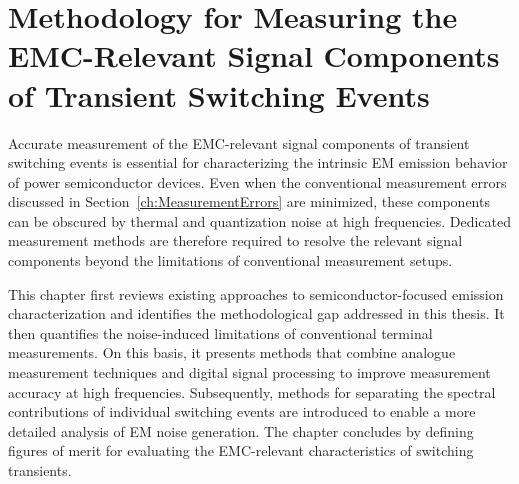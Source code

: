 
\chapter{Methodology for Measuring the EMC-Relevant Signal Components of Transient Switching Events}
\label{ch:Methods}

Accurate measurement of the EMC-relevant signal components of transient switching events is essential for characterizing the intrinsic EM emission behavior of power semiconductor devices.
Even when the conventional measurement errors discussed in Section~\ref{ch:MeasurementErrors} are minimized, these components can be obscured by thermal and quantization noise at high frequencies.
Dedicated measurement methods are therefore required to resolve the relevant signal components beyond the limitations of conventional measurement setups.

This chapter first reviews existing approaches to semiconductor-focused emission characterization and identifies the methodological gap addressed in this thesis.
It then quantifies the noise-induced limitations of conventional terminal measurements.
On this basis, it presents methods that combine analogue measurement techniques and digital signal processing to improve measurement accuracy at high frequencies.
Subsequently, methods for separating the spectral contributions of individual switching events are introduced to enable a more detailed analysis of EM noise generation.
The chapter concludes by defining figures of merit for evaluating the EMC-relevant characteristics of switching transients.


















